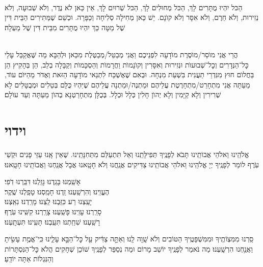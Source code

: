 \documentclass[twoside, openany, parskip=half, 11pt]{book}
\begin{document}
\\
הַכּל יִהְיוּ מֻתָּרִים לָךְ, הַכּל מְחוּלִים לָךְ, הַכּל שְׁרוּיִם לָךְ, אֵין כַּאן לֺא נֶדֶר, וְלֺא שְׁבוּעָה, וְלֺא נְזִירוּת, וְלֺא חֵרֶם, וְלֺא אִסָּר וְלֺא קוׂנָם. יֵשׁ כַּאן מְחִילָה סְלִיחָה וְכַפָּרָה. וּכְשֵׁם שֶׁמַּתִּירִים הַבֵּית דִּין שֶׁל מַטָּה כַּךְ יִהְיוּ מֻתָּרִים מִבֵּית דִּין שֶׁל מַעְלָה׃

\\
הֲרֵי אֲנִי מוֺסֵר/מוֺסֶרֶת מוׂדָעָה לִפְנֵיכֶם וַאֲנִי מְבַטֵּל/מְבַטֶּלֶת מִכַּאן וּלְהַבָּא מַה שֶּׁאֲקַבֵּל עָלַי כׇּל־הַנְּדָרִים וְכׇל־שְׁבוּעוׂת וּנְזִירוּת וְאִסָּרִין וְקוׂנָמוׂת וַחֲרָמוׂת וְהַסְכָּמוׂת וְקַבָּלָה בְלֵב, הֵן בְּהָקִיץ הֵן בַּחֲלוׂם חוּץ מִנִּדְרֵי תַעֲנִית בִּשְׁעַת מִנְחָה. וּבְאִם שֶׁאֶשְׁכַּח לִתְנַאי מוׂדָעָה הַזּאת וְאֶדּׂר מֵהַיּוׂם עוׂד, מֵעַתָּה אֲנִי מִתְחָרֵט/מִתְחָרֶטֶת עֲלֵיהֶם וּמַתְנֶה/וּמַתְנָה עֲלֵיהֶם שֶׁיִּהְיוּ כֻּלָּם בְּטֵלִים וּמְבֻטָּלִים לָא שְׁרִירִין וְלָא קַיָּמִין וְלָא יְהוׂן חָלִין כְּלָל וּכְלָל. בְּכֻלָּן מִתְחָרַטְנָא בְהוׂן מֵעַתָּה וְעַד עוׂלָם׃

\vfill
\sepline




\chapter[וידוי]{ וידוי }

אֱלֹהֵֽינוּ וֵאלֹהֵי אֲבוֹתֵֽינוּ תָּבֹא לְפָנֶֽיךָ תְּפִילָּתֵֽנוּ וְאַל תִּתְעַלַּם מִתְּחִנָּתֵֽינוּ. שֶׁאֵין אָֽנוּ עַזֵּי פָנִים וּקְשֵׁי עֹֽרֶף לוֹמַר לְפָנֶֽיךָ יְיָ אֱלֹהֵֽינוּ וֵאלֹהֵי אֲבוֹתֵֽינוּ צַדִּיקִים אֲנַֽחֲנוּ וְלֹא חָטָֽאנוּ אֲבָל אֲנַֽחְנוּ וַאֲבוֹתֵֽינוּ חָטָֽאנוּ׃

אָשַֽׁמְנוּ׃ בָּגַֽדְנוּ׃ גָּזַֽלְנוּ׃ דִּבַּֽרְנוּ דֹֽפִי׃ \\
הֶעֱוִֽינוּ׃ וְהִרְשַֽׁעְנוּ׃ זַֽדְנוּ׃ חָמַֽסְנוּ׃ טָפַֽלְנוּ שֶֽׁקֶר׃\\
יָעַֽצְנוּ רַע׃ כִּזַּֽבְנוּ׃ לַֽצְנוּ׃ מָרַֽדְנוּ׃ נִאַֽצְנוּ׃ \\
סָרַֽרְנוּ׃ עָוִֽינוּ׃ פָּשַֽׁעְנוּ׃ צָרַֽרְנוּ׃ קִשִּֽׁינוּ עֹֽרֶף׃\\
רָשַֽׁעְנוּ׃ שִׁחַֽתְנוּ׃ תִּעַֽבְנוּ׃ תָּעִֽינוּ׃ תִּעְתָּֽעְנוּ׃

סַֽרְנוּ מִמִּצְוֹתֶֽיךָ וּמִמִּשְׁפָּטֶֽיךָ הַטּוֹבִים וְלֹא שָֽׁוָה לָֽנוּ׃ וְאַתָּ֣ה צַדִּ֔יק עַ֖ל כׇּל־הַבָּ֣א עָלֵ֑ינוּ כִּֽי־אֱמֶ֥ת עָשִׂ֖יתָ וַאֲנַ֥חְנוּ הִרְשָֽׁעְנוּ׃ מַה נֹּאמַר לְפָנֶֽיךָ יוֹשֵׁב מָרוֹם וּמַה נְסַפֵּר לְפָנֶֽיךָ שׁוֹכֵן שְׁחָקִים הֲלֹא כׇּל־הַנִּסְתָּרוֹת וְהַנִּגְלוֹת אַתָּה יוֹדֵֽעַ׃
\end{document}
